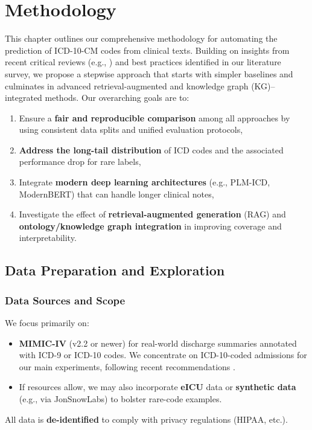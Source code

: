 \chapter{Methodology}

This chapter outlines our comprehensive methodology for automating the prediction of ICD-10-CM codes from clinical texts. Building on insights from recent critical reviews (e.g., \cite{edin2023automated,nguyen2023mimicivicd}) and best practices identified in our literature survey, we propose a stepwise approach that starts with simpler baselines and culminates in advanced retrieval-augmented and knowledge graph (KG)–integrated methods. Our overarching goals are to:

\begin{enumerate}
    \item Ensure a \textbf{fair and reproducible comparison} among all approaches by using consistent data splits and unified evaluation protocols,
    \item \textbf{Address the long-tail distribution} of ICD codes and the associated performance drop for rare labels,
    \item Integrate \textbf{modern deep learning architectures} (e.g., PLM-ICD, ModernBERT) that can handle longer clinical notes,
    \item Investigate the effect of \textbf{retrieval-augmented generation} (RAG) and \textbf{ontology/knowledge graph integration} in improving coverage and interpretability.
\end{enumerate}

\section{Data Preparation and Exploration}

\subsection{Data Sources and Scope}
We focus primarily on:
\begin{itemize}
    \item \textbf{MIMIC-IV} (v2.2 or newer) for real-world discharge summaries annotated with ICD-9 or ICD-10 codes. We concentrate on ICD-10-coded admissions for our main experiments, following recent recommendations \cite{edin2023automated}.
    \item If resources allow, we may also incorporate \textbf{eICU} data or \textbf{synthetic data} (e.g., via JonSnowLabs) to bolster rare-code examples.
\end{itemize}
All data is \textbf{de-identified} to comply with privacy regulations (HIPAA, etc.).

